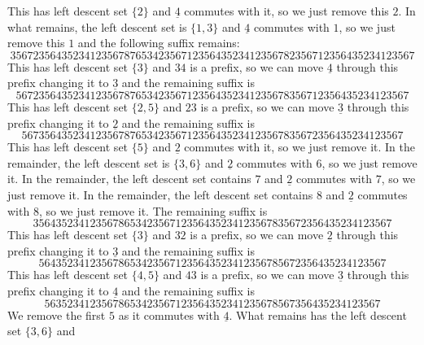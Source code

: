 \documentclass[a4paper]{amsart}
\begin{document}
This has left descent set $\{2\}$ and $\underline{4}$ commutes
with it, so we just remove this $2$. In what remains, 
the left descent set is $\{1,3\}$ and $\underline{4}$ commutes
with $1$, so we just remove this $1$ and the following suffix remains:
\begin{displaymath}
35672356435234123567876534235671235643523412356782356712356435234123567 
\end{displaymath}
This has left descent set $\{3\}$ and  $34$ is a prefix, 
so we can  move $\underline{4}$ through this prefix 
changing it to $\underline{3}$ and the remaining
suffix is
\begin{displaymath}
567235643523412356787653423567123564352341235678356712356435234123567
\end{displaymath}
This has left descent set $\{2,5\}$ and  $23$ is a prefix, 
so we can  move $\underline{3}$ through this prefix 
changing it to $\underline{2}$ and the remaining
suffix is
\begin{displaymath}
5673564352341235678765342356712356435234123567835672356435234123567
\end{displaymath}
This has left descent set $\{5\}$ and $\underline{2}$ commutes
with it, so we just remove it. In the remainder,
the left descent set is $\{3,6\}$ and $\underline{2}$ commutes
with $6$, so we just remove it. In the remainder,
the left descent set contains $7$ and $\underline{2}$ commutes
with $7$, so we just remove it. In the remainder,
the left descent set contains $8$ and $\underline{2}$ commutes
with $8$, so we just remove it. The remaining suffix is
\begin{displaymath}
356435234123567865342356712356435234123567835672356435234123567
\end{displaymath}
This has left descent set $\{3\}$ and  $32$ is a prefix, 
so we can  move $\underline{2}$ through this prefix 
changing it to $\underline{3}$ and the remaining
suffix is
\begin{displaymath}
5643523412356786534235671235643523412356785672356435234123567
\end{displaymath}
This has left descent set $\{4,5\}$ and  $43$ is a prefix, 
so we can  move $\underline{3}$ through this prefix 
changing it to $\underline{4}$ and the remaining
suffix is
\begin{displaymath}
56352341235678653423567123564352341235678567356435234123567
\end{displaymath}
We remove the first $5$ as it commutes with $\underline{4}$.
What remains has the left descent set $\{3,6\}$ and
\end{document}
